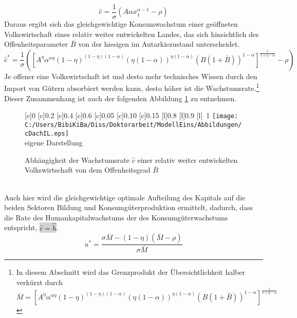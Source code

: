 \begin{equation}
\hat{c}=\frac{1}{\sigma}(A\alpha x_1^{\alpha-1}-\rho)
\end{equation}
Daraus ergibt sich das gleichgewichtige Konsumwachstum einer geöffneten Volkswirtschaft eines relativ weiter entwickelten Landes, das sich hinsichtlich des Offenheitsparameter $\bar{B}$ von der hiesigen im Autarkiezustand unterscheidet.
\begin{equation}
\boxed{\hat{c}^*=\frac{1}{\sigma}\left(\left[A^\eta\alpha^{\alpha\eta}(1-\eta)^{(1-\eta)(1-\alpha)}(\eta(1-\alpha))^{\eta(1-\alpha)}(B(1+\bar{B}))^{1-\alpha}\right]^\frac{1}{1+\eta-\alpha}-\rho\right)}
\end{equation}
Je offener eine Volkswirtschaft ist und desto mehr technisches Wissen durch den Import von Gütern absorbiert werden kann, desto höher ist die Wachstumsrate.\footnote{In diesem Abschnitt wird das Grenzprodukt der Übersichtlichkeit halber verkürzt durch $\bar{M}=\left[A^\eta\alpha^{\alpha\eta}(1-\eta)^{(1-\eta)(1-\alpha)}(\eta(1-\alpha))^{\eta(1-\alpha)}(B(1+\bar{B}))^{1-\alpha}\right]^\frac{1}{1+\eta-\alpha}$} Dieser Zusammenhang ist auch der folgenden Abbildung \ref{fig:cDachIL} zu entnehmen. 
\begin{figure}[htb] 
\vspace{0.23cm}
 \centering 
		[c]{\footnotesize{0}}
		[c]{\footnotesize{0.2}}
		[c]{\footnotesize{0.4}}
		[c]{\footnotesize{0.6}}
		[c]{\footnotesize{0.05}}
		[c]{\footnotesize{0.10}}
		[c]{\footnotesize{0.15}}
		[l]{\footnotesize{0.8}}
		[l]{\footnotesize{0.9}}
		[l]{~\footnotesize{1}}
\texttt{[image: C:/Users/BibiKiBa/Diss/Doktorarbeit/ModellEins/Abbildungen/cDachIL.eps]}
\\
\hfill\footnotesize{}  eigene Darstellung
	\caption{Abhängigkeit der Wachstumsrate $\hat{c}$ einer relativ weiter entwickelten Volkswirtschaft von dem Offenheitsgrad $\bar{B}$}
	\label{fig:cDachIL}
\end{figure}
\\
Auch hier wird die gleichgewichtige optimale Aufteilung des Kapitals auf die beiden Sektoren Bildung und Konsumgüterproduktion ermittelt, dadurch, dass die Rate des Humankapitalwachstums der des Konsumgüterwachstums entspricht, \colorbox{lightgray}{$\hat{c}=\hat{h}$}.
\begin{equation}
\boxed{u^*=\frac{\sigma \bar{M}-(1-\eta)(\bar{M}-\rho)}{\sigma \bar{M}}}
\end{equation}

